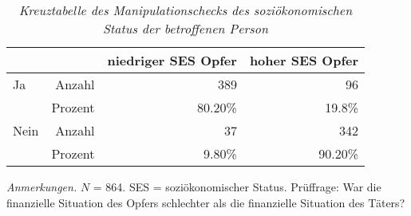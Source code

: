 \begin{table}[htb]
    \caption[Kreuztabelle Manipulationscheck soziökonomischer Status des Opfers]{\textit {Kreuztabelle des Manipulationschecks des soziökonomischen Status der betroffenen Person}} 
    \label{KT_SES}
    \centering
    \begin{adjustbox}{width=10cm} %
    \small
    \begin{tabular}{lrrr}
      \hline
        &   & niedriger SES Opfer & hoher SES Opfer \\
      \hline
    Ja   & Anzahl  & 389      & 96      \\
         & Prozent & 80.20\%  & 19.8\%  \\
    Nein & Anzahl  & 37       & 342     \\
         & Prozent & 9.80\%   & 90.20\% \\
       \hline
    \end{tabular}
    \end{adjustbox}
    
    \begin{tablenotes}
        \item \textit{Anmerkungen.} \( N \) = 864. SES = soziökonomischer Status. Prüffrage: War die finanzielle Situation des Opfers schlechter als die finanzielle Situation des Täters?
      \end{tablenotes}
    \end{table}